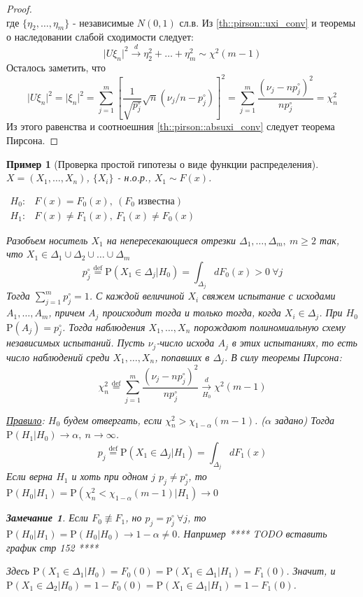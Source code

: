 \documentclass[12pt]{article}
\newtheorem*{remark*}{Замечание}
\newtheorem*{example}{Пример}
\theoremstyle{basic_theorem}
\theoremstyle{name_theorem}
\newcommand*{\defeq}{\stackrel{\text{def}}{=}}
\def\P{ \mathrm{P} }
\begin{document}
\begin{proof}
\begin{equation}
        \end{equation}
        где $\{\eta_2,\ldots,\eta_m\}$ - независимые $N(0,1)$ сл.в. Из \eqref{th::pirson::uxi_conv}
        и теоремы о наследовании слабой сходимости следует:
        \begin{equation}\label{th::pirson::absuxi_conv}
            \lvert U\xi_n\rvert^2\xrightarrow{d} \eta_2^2+\ldots+\eta_m^2\sim\chi^2(m-1)
        \end{equation}
        Осталось заметить, что
        \[\lvert U\xi_n\rvert^2=\lvert\xi_n\rvert^2=\sum_{j=1}^m\left[\frac{1}{\sqrt{p_j^\circ}}\sqrt{n}(\nu_j/n-p_j^\circ)\right]^2=\sum_{j=1}^m\frac{(\nu_j-np_j^\circ)^2}{np_j^\circ}=\chi_n^2\]
        Из этого равенства и соотноешния \eqref{th::pirson::absuxi_conv} следует теорема Пирсона.
    \end{proof}

    \begin{example}[Проверка простой гипотезы о виде функции распределения]
    $X=(X_1,\ldots,X_n)$, $\{X_i\}$ - н.о.р., $X_1\sim F(x)$.

    $\begin{array}{cl}
        H_0:& F(x)=F_0(x),\ (F_0\text{ известна})\\
        H_1:& F(x)\neq F_1(x),\ F_1(x)\neq F_0(x)
    \end{array}$

    Разобъем носитель $X_1$ на непересекающиеся отрезки $\Delta_1,\ldots,\Delta_m,\ m\geq2$ так, что
    $X_1\in\Delta_1\cup\Delta_2\cup\ldots\cup\Delta_m$
    \[p_j^\circ\defeq \P(X_1\in\Delta_j\vert H_0) =\int_{\Delta_j}dF_0(x)>0\ \forall j\]
    Тогда $\sum_{j=1}^mp_j^\circ=1$. С каждой величиной $X_i$ свяжем испытание
    с исходами $A_1,\ldots,A_m$, причем $A_j$ происходит тогда и только тогда,
    когда $X_i\in\Delta_j$. При $H_0$ $\P(A_j)=p_j^\circ$. Тогда наблюдения
    $X_1,\ldots,X_n$ порождают полиномиальную схему независимых испытаний.
    Пусть $\nu_j$-число исхода $A_j$ в этих испытаниях, то есть число
    наблюдений среди $X_1,\ldots,X_n$, попавших в $\Delta_j$.
    В силу теоремы Пирсона:
    \[\chi_n^2\defeq\sum_{j=1}^m\frac{(\nu_j-np^\circ_j)^2}{np^\circ_j}\xrightarrow[H_0]{d}\chi^2(m-1)\]

    \underline{Правило}: $H_0$ будем отвергать, если $\chi_n^2>\chi_{1-\alpha}(m-1)$. ($\alpha$ задано)
    Тогда $\P(H_1\vert H_0)\rightarrow\alpha,\ n\rightarrow\infty$.
    \[p_j\defeq \P(X_1\in\Delta_j\vert H_1)=\int_{\Delta_j}dF_1(x)\]
    Если верна $H_1$ и хоть при одном $j$ $p_j\neq p_j^\circ$, то
    $\P(H_0\vert H_1) = \P(\chi_n^2<\chi_{1-\alpha}(m-1)\vert H_1)\rightarrow 0$
    \begin{remark*}
        Если $F_0\not\equiv F_1$, но $p_j=p_j^\circ\ \forall j$,
        то $\P(H_0\vert H_1)=\P(H_0\vert H_0)\rightarrow1-\alpha\neq0$.
        Например
        **** TODO вставить график стр 152 ****

        Здесь $\P(X_1\in\Delta_1\vert H_0)=F_0(0)=\P(X_1\in\Delta_1\vert H_1)=F_1(0)$.
        Значит, и $\P(X_1\in\Delta_2\vert H_0)=1-F_0(0)=\P(X_1\in\Delta_1\vert H_1)=1-F_1(0)$.
    \end{remark*}
    \end{example}
\end{document}
